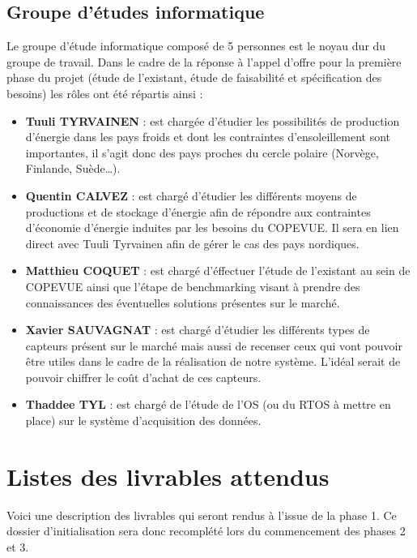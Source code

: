     \subsection{Groupe d'études informatique}
Le groupe d'étude informatique composé de 5 personnes est le noyau dur du groupe de travail. Dans le cadre de la réponse à l'appel d'offre pour la première phase du projet (étude de l'existant, étude de faisabilité et spécification des besoins) les rôles ont été répartis ainsi  :
\begin{itemize}
\item \textbf{Tuuli TYRVAINEN} : est chargée d'étudier les possibilités de production d'énergie dans les pays froids et dont les contraintes d'ensoleillement sont importantes, il s'agit donc des pays proches du cercle polaire (Norvège, Finlande, Suède…).
\item \textbf{Quentin CALVEZ} : est chargé d'étudier les différents moyens de productions et de stockage d'énergie afin de répondre aux contraintes d'économie d'énergie induites par les besoins du COPEVUE. Il sera en lien direct avec Tuuli Tyrvainen afin de gérer le cas des pays nordiques.
\item \textbf{Matthieu COQUET} : est chargé d'éffectuer l'étude de l'existant au sein de COPEVUE ainsi que l'étape de benchmarking visant à prendre des connaissances des éventuelles solutions présentes sur le marché.
\item \textbf{Xavier SAUVAGNAT} : est chargé d'étudier les différents types de capteurs présent sur le marché mais aussi de recenser ceux qui vont pouvoir être utiles dans le cadre de la réalisation de notre système. L'idéal serait de pouvoir chiffrer le coût d'achat de ces capteurs. 
\item \textbf{Thaddee TYL} : est chargé de l'étude de l'OS (ou du RTOS à mettre en place) sur le système d'acquisition des données.
\end{itemize}

    
    \section{Listes des livrables attendus}
Voici une description des livrables qui seront rendus à l'issue de la phase 1. Ce dossier d'initialisation sera donc recomplété lors du commencement des phases 2 et 3.
